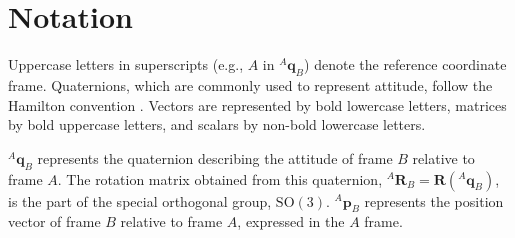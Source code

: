 \section{Notation}
\label{sec: notation}
Uppercase letters in superscripts (e.g., $A$ in ${}^A\mathbf{q}_B$) denote the reference coordinate frame. Quaternions, which are commonly used to represent attitude, follow the Hamilton convention \cite{sola2017quaternion}. Vectors are represented by bold lowercase letters, matrices by bold uppercase letters, and scalars by non-bold lowercase letters.

${}^A\mathbf{q}_B$ represents the quaternion describing the attitude of frame $B$ relative to frame $A$. The rotation matrix obtained from this quaternion, ${}^A\mathbf{R}_B = \mathbf{R}({}^A\mathbf{q}_B)$, is the part of the special orthogonal group, $\text{SO}(3)$. ${}^A\mathbf{p}_B$ represents the position vector of frame $B$ relative to frame $A$, expressed in the $A$ frame.
